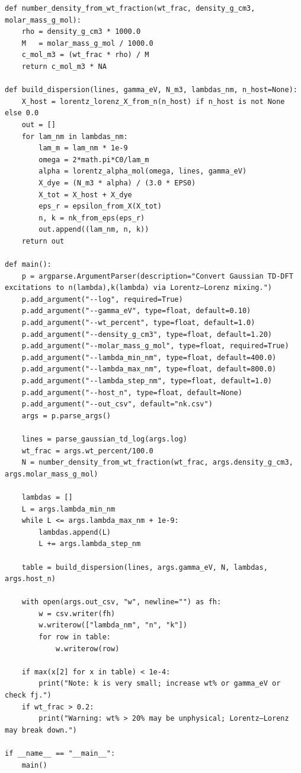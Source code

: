 \documentclass[11pt,a4paper]{article}
\begin{document}
\begin{verbatim}
def number_density_from_wt_fraction(wt_frac, density_g_cm3, molar_mass_g_mol):
    rho = density_g_cm3 * 1000.0
    M   = molar_mass_g_mol / 1000.0
    c_mol_m3 = (wt_frac * rho) / M
    return c_mol_m3 * NA

def build_dispersion(lines, gamma_eV, N_m3, lambdas_nm, n_host=None):
    X_host = lorentz_lorenz_X_from_n(n_host) if n_host is not None else 0.0
    out = []
    for lam_nm in lambdas_nm:
        lam_m = lam_nm * 1e-9
        omega = 2*math.pi*C0/lam_m
        alpha = lorentz_alpha_mol(omega, lines, gamma_eV)
        X_dye = (N_m3 * alpha) / (3.0 * EPS0)
        X_tot = X_host + X_dye
        eps_r = epsilon_from_X(X_tot)
        n, k = nk_from_eps(eps_r)
        out.append((lam_nm, n, k))
    return out

def main():
    p = argparse.ArgumentParser(description="Convert Gaussian TD-DFT excitations to n(lambda),k(lambda) via Lorentz–Lorenz mixing.")
    p.add_argument("--log", required=True)
    p.add_argument("--gamma_eV", type=float, default=0.10)
    p.add_argument("--wt_percent", type=float, default=1.0)
    p.add_argument("--density_g_cm3", type=float, default=1.20)
    p.add_argument("--molar_mass_g_mol", type=float, required=True)
    p.add_argument("--lambda_min_nm", type=float, default=400.0)
    p.add_argument("--lambda_max_nm", type=float, default=800.0)
    p.add_argument("--lambda_step_nm", type=float, default=1.0)
    p.add_argument("--host_n", type=float, default=None)
    p.add_argument("--out_csv", default="nk.csv")
    args = p.parse_args()

    lines = parse_gaussian_td_log(args.log)
    wt_frac = args.wt_percent/100.0
    N = number_density_from_wt_fraction(wt_frac, args.density_g_cm3, args.molar_mass_g_mol)

    lambdas = []
    L = args.lambda_min_nm
    while L <= args.lambda_max_nm + 1e-9:
        lambdas.append(L)
        L += args.lambda_step_nm

    table = build_dispersion(lines, args.gamma_eV, N, lambdas, args.host_n)

    with open(args.out_csv, "w", newline="") as fh:
        w = csv.writer(fh)
        w.writerow(["lambda_nm", "n", "k"])
        for row in table:
            w.writerow(row)

    if max(x[2] for x in table) < 1e-4:
        print("Note: k is very small; increase wt% or gamma_eV or check fj.")
    if wt_frac > 0.2:
        print("Warning: wt% > 20% may be unphysical; Lorentz–Lorenz may break down.")

if __name__ == "__main__":
    main()
\end{verbatim}
\end{document}
